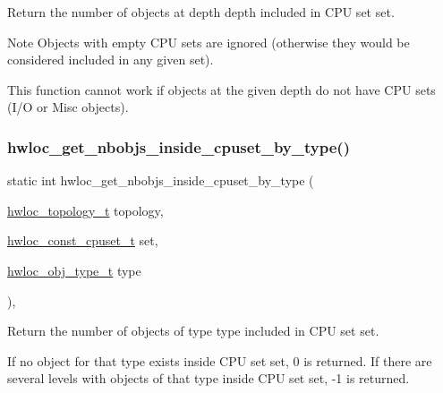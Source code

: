 Return the number of objects at depth {\ttfamily depth} included in C\+PU set {\ttfamily set}. 

\begin{DoxyNote}{Note}
Objects with empty C\+PU sets are ignored (otherwise they would be considered included in any given set).

This function cannot work if objects at the given depth do not have C\+PU sets (I/O or Misc objects). 
\end{DoxyNote}
\mbox{\label{a00195_ga133c40415de008518608f8bff52a5ab9}} 
\subsubsection{\texorpdfstring{hwloc\+\_\+get\+\_\+nbobjs\+\_\+inside\+\_\+cpuset\+\_\+by\+\_\+type()}{hwloc\_get\_nbobjs\_inside\_cpuset\_by\_type()}}
{\footnotesize\ttfamily static int hwloc\+\_\+get\+\_\+nbobjs\+\_\+inside\+\_\+cpuset\+\_\+by\+\_\+type (\begin{DoxyParamCaption}\item[{\hyperlink{a00186_ga9d1e76ee15a7dee158b786c30b6a6e38}{hwloc\+\_\+topology\+\_\+t}}]{topology,  }\item[{\hyperlink{a00183_ga1f784433e9b606261f62d1134f6a3b25}{hwloc\+\_\+const\+\_\+cpuset\+\_\+t}}]{set,  }\item[{\hyperlink{a00184_gacd37bb612667dc437d66bfb175a8dc55}{hwloc\+\_\+obj\+\_\+type\+\_\+t}}]{type }\end{DoxyParamCaption})\hspace{0.3cm}{\ttfamily [inline]}, {\ttfamily [static]}}



Return the number of objects of type {\ttfamily type} included in C\+PU set {\ttfamily set}. 

If no object for that type exists inside C\+PU set {\ttfamily set}, 0 is returned. If there are several levels with objects of that type inside C\+PU set {\ttfamily set}, -\/1 is returned.

